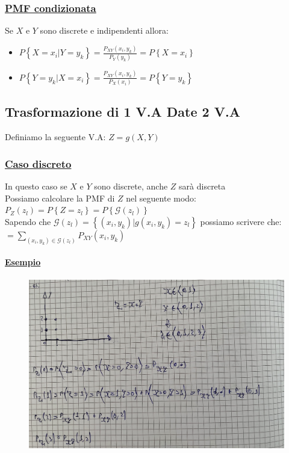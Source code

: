 \documentclass{article}
\begin{document}
\subsubsection{\underline{PMF condizionata}}
Se $X$ e $Y$ sono discrete e indipendenti allora: 
\begin{itemize}
    \item $P\left\{ X = x_i| Y = y_k\right\} = \frac{P_{XY}(x_i,y_k)}{P_Y(y_k)} = P\left\{ X = x_i \right\}$
    \item $P\left\{ Y = y_k| X = x_i\right\} = \frac{P_{XY}(x_i,y_k)}{P_X(x_i)} = P\left\{ Y = y_k \right\}$
\end{itemize}

\subsection{Trasformazione di 1 V.A Date 2 V.A}
Definiamo la seguente V.A: $Z = g(X,Y)$
\subsubsection{\underline{Caso discreto}}
In questo caso se $X$ e $Y$ sono discrete, anche $Z$ sarà discreta \\
Possiamo calcolare la PMF di $Z$ nel seguente modo: \\
$P_Z(z_l) = P\left\{ Z = z_l\right\} = P\left\{ \mathcal{G}(z_l)\right\}$ \\
Sapendo che $\mathcal{G}(z_l) = \left\{ (x_i,y_k) | g(x_i,y_k) = z_l \right\}$ possiamo scrivere che: \\
$= \sum_{(x_i,y_k) \in \mathcal{G}(z_l)} P_{XY}(x_i,y_k)$
\paragraph{\underline{Esempio}}
\begin{figure}[H]
\centering
\includegraphics[scale=0.14]{ese/45.jpeg}
\end{figure} 
\end{document}
